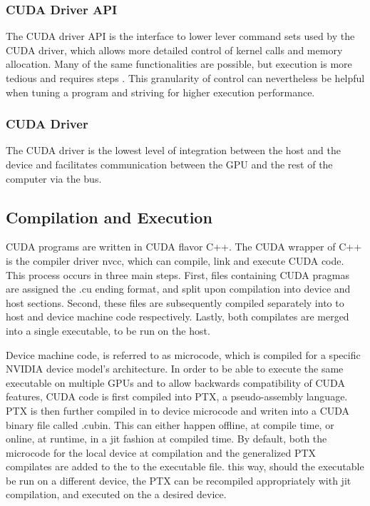 \subsubsection{CUDA Driver API}
The CUDA driver API is the interface to lower lever command sets used by the CUDA driver, which allows more detailed control
of kernel calls and memory allocation. Many of the same functionalities are possible,
but execution is more tedious and requires steps \cite{driver}. This granularity of control can nevertheless be
helpful when tuning a program and striving for higher execution performance.
\subsubsection{CUDA Driver}

The CUDA driver is the lowest level of integration between the host and the device
and facilitates communication between the \Gls{GPU} and the rest of the computer via the bus. %


\subsection{Compilation and Execution}


CUDA programs are written in CUDA flavor C++.  The CUDA wrapper of C++ is the
compiler driver nvcc, which can compile, link and execute CUDA code.  This process occurs
 in three main steps. First,
files containing CUDA pragmas are assigned the .cu ending format, and split upon
compilation into device and host sections.  Second, these files are subsequently
compiled separately into to host and device machine code respectively.
Lastly, both compilates are merged into a single executable, to be run on the host.
\par
Device machine code, is referred to as  microcode, which is compiled for a specific
NVIDIA device model's architecture. In order to be able to execute the same executable
on multiple \Glspl{GPU} and to allow backwards compatibility of CUDA features, CUDA code is
first compiled into \Gls{PTX}, a pseudo-assembly language.  \Gls{PTX} is then
further compiled in to device microcode and writen into a CUDA binary file called .cubin. This can either happen offline, at compile time,
or online, at runtime, in a \gls{jit} fashion at compiled time.  By default, both
the microcode for the local device at compilation and the generalized \gls{PTX} compilates are added to the to the executable file.
this way, should the executable be run on a different device, the \gls{PTX} can
be recompiled appropriately with \Gls{jit} compilation, and executed on the a desired device\cite{Wilt}.

